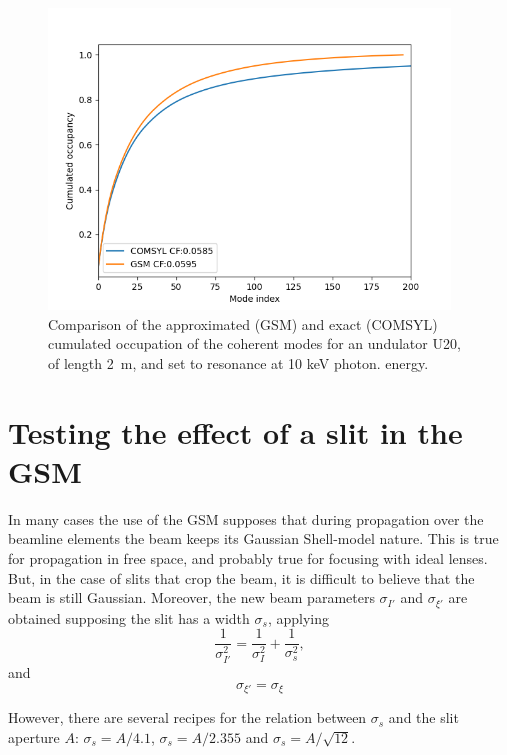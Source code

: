 \documentclass{iucr}              %
\begin{document}
\begin{figure}
    \centering
    \includegraphics[width=0.95\textwidth]{figures/FigureGSMvsCOMSYL.png}
    \caption{Comparison of the approximated (GSM) and exact (COMSYL) cumulated occupation of the coherent modes for an undulator U20, of length \SI{2}{\meter}, and set to resonance at 10 keV photon. energy.}
    \label{fig:GSMvsCOMSYL}
\end{figure}

\section{Testing the effect of a slit in the GSM}
\label{appendix:slit}

In many cases the use of the GSM supposes that during propagation over the beamline elements the beam keeps its Gaussian Shell-model nature. This is true for propagation in free space, and probably true for focusing with ideal lenses. But, in the case of slits that crop the beam, it is difficult to believe that the beam is still Gaussian. Moreover, the new beam parameters $\sigma_{I'}$ and $\sigma_{\xi'}$ are obtained supposing the slit has a width $\sigma_s$, applying
\begin{equation}
    \frac{1}{\sigma_{I'}^2} = 
    \frac{1}{\sigma_{I}^2} +
    \frac{1}{\sigma_{s}^2},
\end{equation}
and
\begin{equation}
    \sigma_{\xi'} = \sigma_{\xi} 
\end{equation}

However, there are several recipes for the relation between $\sigma_s$ and the slit aperture $A$: $\sigma_s=A/4.1$, $\sigma_s=A/2.355$ and $\sigma_s=A/\sqrt{12}$.
\end{document}
